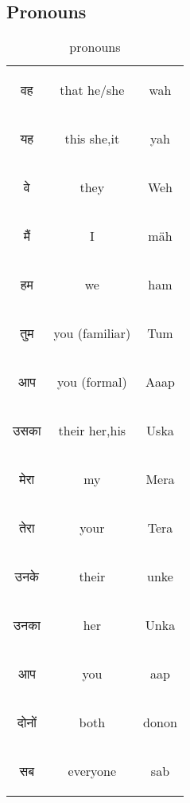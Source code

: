 \newpage 
\subsection{Pronouns}
\begin{table}[H]
    \centering
    \begin{tabular}{c|c|c}
    \begin{hindi} वह \end{hindi} & that he/she & wah \\
    \begin{hindi} यह \end{hindi} & this she,it& yah \\
    \begin{hindi} वे \end{hindi} & they &  Weh \\
    \begin{hindi} मैं \end{hindi} & I & mäh \\    
    \begin{hindi} हम \end{hindi} &  we & ham \\    
    \begin{hindi} तुम \end{hindi} &  you (familiar) & Tum\\    
    \begin{hindi} आप \end{hindi} &  you (formal) & Aaap \\    
    \begin{hindi} उसका  \end{hindi} & their her,his  & Uska \\    
    \begin{hindi} मेरा \end{hindi} &  my & Mera \\    
    \begin{hindi} तेरा \end{hindi} &  your & Tera \\    
    \begin{hindi} उनके \end{hindi} & their & unke \\
    \begin{hindi} उनका \end{hindi} & her & Unka \\
    \begin{hindi} आप \end{hindi} & you & aap \\
    \begin{hindi} दोनों \end{hindi} & both & donon \\
    \begin{hindi} सब \end{hindi} & everyone & sab \\
    \end{tabular}
    \caption{pronouns}    
    \label{tab:pronouns}
\end{table}

